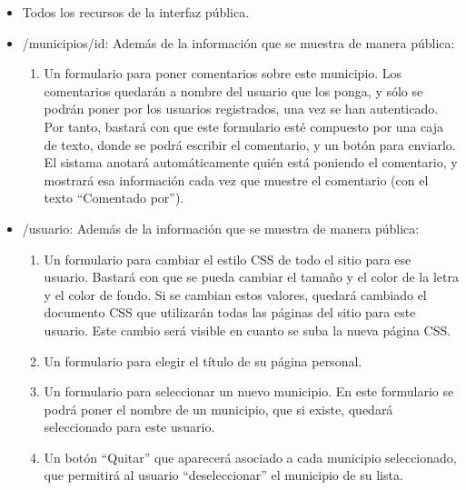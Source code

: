 \begin{itemize}
  \item Todos los recursos de la interfaz pública.

  \item /municipios/{id}: Además de la información que se muestra de manera pública:

    \begin{enumerate}
    \item Un formulario para poner comentarios sobre este municipio. Los comentarios quedarán a nombre del usuario que los ponga, y sólo se podrán poner por los usuarios registrados, una vez se han autenticado. Por tanto, bastará con que este formulario esté compuesto por una caja de texto, donde se podrá escribir el comentario, y un botón para enviarlo. El sistama anotará automáticamente quién está poniendo el comentario, y mostrará esa información cada vez que muestre el comentario (con el texto ``Comentado por'').
  \end{enumerate}

  \item /{usuario}: Además de la información que se muestra de manera pública:
  
  \begin{enumerate}
    \item Un formulario para cambiar el estilo CSS de todo el sitio para ese usuario. Bastará con que se pueda cambiar el tamaño y el color de la letra y el color de fondo. Si se cambian estos valores, quedará cambiado el documento CSS que utilizarán todas las páginas del sitio para este usuario. Este cambio será visible en cuanto se suba la nueva página CSS.

    \item Un formulario para elegir el título de su página personal.

    \item Un formulario para seleccionar un nuevo municipio. En este formulario se podrá poner el nombre de un municipio, que si existe, quedará seleccionado para este usuario.

    \item Un botón ``Quitar'' que aparecerá asociado a cada municipio seleccionado, que permitirá al usuario ``deseleccionar'' el municipio de su lista.
  \end{enumerate}
\end{itemize}


